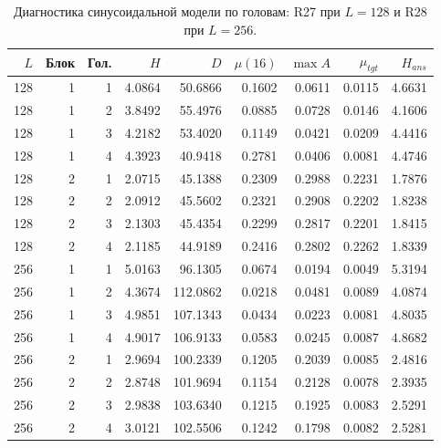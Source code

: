 \begin{table}[H]\centering\footnotesize
\setlength{\tabcolsep}{4pt}
\caption{Диагностика синусоидальной модели по головам: R27 при $L=128$ и R28 при $L=256$.}\label{tab:attention}
\begin{tabular}{rrrrrrrrr}
\toprule
$L$ & Блок & Гол. & $H$ & $D$ & $\mu(16)$ & $\max A$ & $\mu_{tgt}$ & $H_{ans}$ \\
\midrule
128 & 1 & 1 & 4.0864 & 50.6866 & 0.1602 & 0.0611 & 0.0115 & 4.6631 \\
128 & 1 & 2 & 3.8492 & 55.4976 & 0.0885 & 0.0728 & 0.0146 & 4.1606 \\
128 & 1 & 3 & 4.2182 & 53.4020 & 0.1149 & 0.0421 & 0.0209 & 4.4416 \\
128 & 1 & 4 & 4.3923 & 40.9418 & 0.2781 & 0.0406 & 0.0081 & 4.4746 \\
128 & 2 & 1 & 2.0715 & 45.1388 & 0.2309 & 0.2988 & 0.2231 & 1.7876 \\
128 & 2 & 2 & 2.0912 & 45.5602 & 0.2321 & 0.2908 & 0.2202 & 1.8238 \\
128 & 2 & 3 & 2.1303 & 45.4354 & 0.2299 & 0.2817 & 0.2201 & 1.8415 \\
128 & 2 & 4 & 2.1185 & 44.9189 & 0.2416 & 0.2802 & 0.2262 & 1.8339 \\
256 & 1 & 1 & 5.0163 & 96.1305 & 0.0674 & 0.0194 & 0.0049 & 5.3194 \\
256 & 1 & 2 & 4.3674 & 112.0862 & 0.0218 & 0.0481 & 0.0089 & 4.0874 \\
256 & 1 & 3 & 4.9851 & 107.1343 & 0.0434 & 0.0223 & 0.0081 & 4.8035 \\
256 & 1 & 4 & 4.9017 & 106.9133 & 0.0583 & 0.0245 & 0.0087 & 4.8682 \\
256 & 2 & 1 & 2.9694 & 100.2339 & 0.1205 & 0.2039 & 0.0085 & 2.4816 \\
256 & 2 & 2 & 2.8748 & 101.9694 & 0.1154 & 0.2128 & 0.0078 & 2.3935 \\
256 & 2 & 3 & 2.9838 & 103.6340 & 0.1215 & 0.1925 & 0.0083 & 2.5291 \\
256 & 2 & 4 & 3.0121 & 102.5506 & 0.1242 & 0.1798 & 0.0082 & 2.5281 \\
\bottomrule
\end{tabular}
\end{table}
